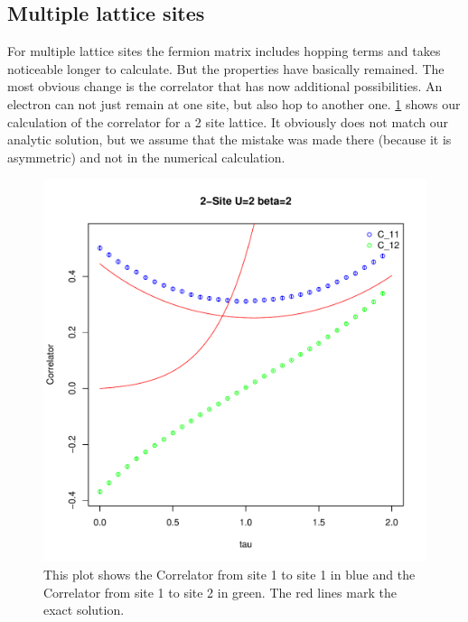 \subsection{Multiple lattice sites}
For multiple lattice sites the fermion matrix includes hopping terms and takes noticeable longer to calculate. But the properties have basically remained.
The most obvious change is the correlator that has now additional possibilities. An electron can not just remain at one site, but also hop to another one. \ref{fig:plotc2t} shows our calculation of the correlator for a 2 site lattice. It obviously does not match our analytic solution, but we assume that the mistake was made there (because it is asymmetric) and not in the numerical calculation.
\begin{figure}[H]
	\centering
	\includegraphics[width=0.5\linewidth]{figs/plot_C2t}
	\caption[Correlator 2-site]{This plot shows the Correlator from site 1 to site 1 in blue and the Correlator from site 1 to site 2 in green. The red lines mark the exact solution.}
	\label{fig:plotc2t}
\end{figure}
